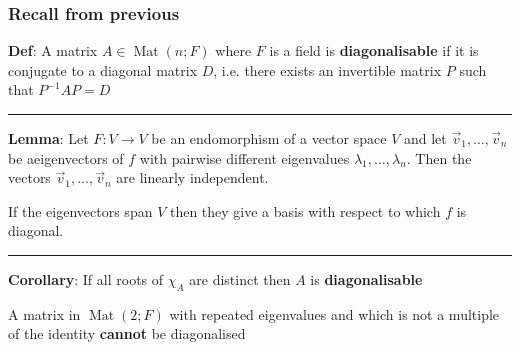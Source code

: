 \documentclass{article}
\DeclareMathOperator{\Mat}{Mat}
\begin{document}
\subsubsection{Recall from previous}

\textbf{Def}: A matrix $A\in \Mat(n;F)$ where $F$ is a field is \textbf{diagonalisable} if it is conjugate to a diagonal matrix $D$, i.e. there exists an invertible matrix $P$ such that $P^{-1}AP = D$

\noindent\rule{\textwidth}{0.2pt}
\textbf{Lemma}: Let $F : V\to V$ be an endomorphism of a vector space $V$ and let $\vec{v}_{1},\dots,\vec{v}_{n}$ be aeigenvectors of $f$ with pairwise different eigenvalues $\lambda_{1},\dots,\lambda_{n}$. Then the vectors $\vec{v}_{1},\dots,\vec{v}_{n}$ are linearly independent.

If the eigenvectors span $V$ then they give a basis with respect to which $f$ is diagonal.

\noindent\rule{\textwidth}{0.2pt}
\textbf{Corollary}: If all roots of $\chi_{A}$ are distinct then $A$ is \textbf{diagonalisable}

A matrix in $\Mat(2;F)$ with repeated eigenvalues and which is not a multiple of the identity \textbf{cannot} be diagonalised
\end{document}
